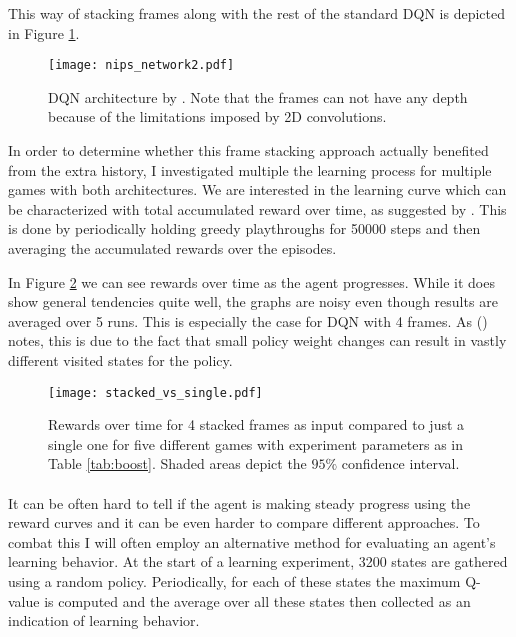 This way of stacking frames along with the rest of the standard DQN
is depicted in Figure \ref{fig:nips_network2}.

\begin{figure}[htpb]
  \centering
  \texttt{[image: nips\_network2.pdf]}
  \caption{DQN architecture by \cite{Mnih2013}.
    Note that the frames can not have any depth because of
    the limitations imposed by 2D convolutions.
  }
  \label{fig:nips_network2}
\end{figure}

In order to determine
whether this frame stacking approach
actually benefited from the extra history,
I investigated multiple
the learning process for multiple games
with both architectures.
We are interested in the learning curve
which can be characterized with
total accumulated reward over time,
as suggested by \citeauthor{Bellemare2015} \citeyear{Bellemare2015}.
This is done by periodically
holding greedy playthroughs for 50000 steps
and then averaging the accumulated rewards
over the episodes.

In Figure \ref{fig:stacked_vs_single_rewards}
we can see rewards over time as the agent progresses.
While it does show general tendencies quite well,
the graphs are noisy even though results are averaged over 5 runs.
This is especially the case for DQN with 4 frames.
As \citeauthor{Mnih2013} (\citeyear{Mnih2013}) notes,
this is due to the fact that small policy weight changes
can result in vastly different visited states for the policy.



\begin{figure}[htpb]
  \centering
  \texttt{[image: stacked\_vs\_single.pdf]}
  \caption{
    Rewards over time for 4 stacked frames as input
    compared to just a single one
    for five different games
    with experiment parameters as in Table \ref{tab:boost}.
    Shaded areas depict the $95\%$ confidence interval.
  }
  \label{fig:stacked_vs_single_rewards}
\end{figure}

\paragraph{}
It can be often hard to tell if the agent is making steady progress
using the reward curves
and it can be even harder to compare different approaches.
To combat this I will often employ an alternative method
for evaluating an agent's learning behavior.
At the start of a learning experiment, 3200 states are gathered
using a random policy.
Periodically,
for each of these states the maximum Q-value is computed
and the average over all these states then collected
as an indication of learning behavior.

